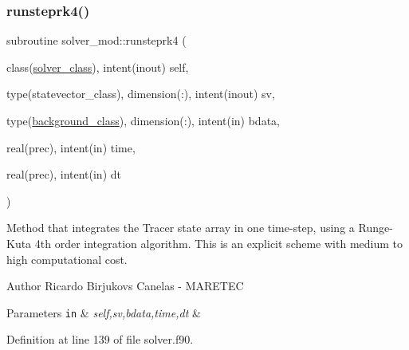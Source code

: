 \subsubsection{\texorpdfstring{runsteprk4()}{runsteprk4()}}
{\footnotesize\ttfamily subroutine solver\+\_\+mod\+::runsteprk4 (\begin{DoxyParamCaption}\item[{class(\mbox{\hyperlink{structsolver__mod_1_1solver__class}{solver\+\_\+class}}), intent(inout)}]{self,  }\item[{type(statevector\+\_\+class), dimension(\+:), intent(inout)}]{sv,  }\item[{type(\mbox{\hyperlink{structbackground__mod_1_1background__class}{background\+\_\+class}}), dimension(\+:), intent(in)}]{bdata,  }\item[{real(prec), intent(in)}]{time,  }\item[{real(prec), intent(in)}]{dt }\end{DoxyParamCaption})\hspace{0.3cm}{\ttfamily [private]}}



Method that integrates the Tracer state array in one time-\/step, using a Runge-\/\+Kuta 4th order integration algorithm. This is an explicit scheme with medium to high computational cost. 

\begin{DoxyAuthor}{Author}
Ricardo Birjukovs Canelas -\/ M\+A\+R\+E\+T\+EC 
\end{DoxyAuthor}

\begin{DoxyParams}[1]{Parameters}
\mbox{\tt in}  & {\em self,sv,bdata,time,dt} & \\
\hline
\end{DoxyParams}


Definition at line 139 of file solver.\+f90.


